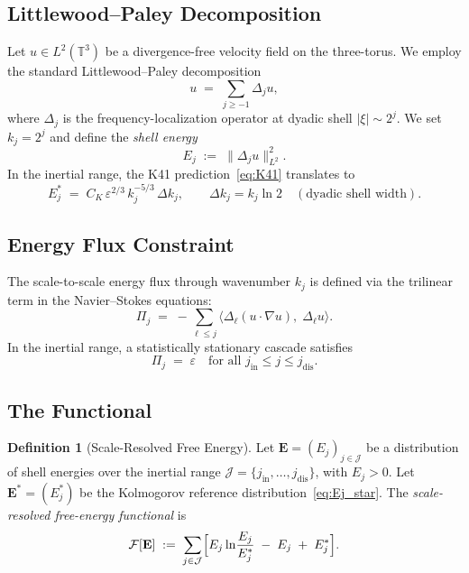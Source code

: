 \documentclass[12pt,a4paper]{article}
\theoremstyle{definition}
\newtheorem{definition}{Definition}[section]
\theoremstyle{plain}
\theoremstyle{remark}
\begin{document}
\subsection{Littlewood--Paley Decomposition}

Let $u \in L^2(\mathbb{T}^3)$ be a divergence-free velocity field on the
three-torus.  We employ the standard Littlewood--Paley decomposition
\begin{equation}\label{eq:LP}
  u \;=\; \sum_{j \ge -1} \Delta_j u,
\end{equation}
where $\Delta_j$ is the frequency-localization operator at dyadic shell
$|\xi| \sim 2^j$.  We set $k_j = 2^j$ and define the \emph{shell energy}
\begin{equation}\label{eq:Ej}
  E_j \;:=\; \|\Delta_j u\|_{L^2}^2.
\end{equation}
In the inertial range, the K41 prediction~\eqref{eq:K41} translates to
\begin{equation}\label{eq:Ej_star}
  E_j^* \;=\; C_K\, \varepsilon^{2/3}\, k_j^{-5/3} \,\Delta k_j,
  \qquad \Delta k_j = k_j \ln 2 \quad (\text{dyadic shell width}).
\end{equation}

\subsection{Energy Flux Constraint}

The scale-to-scale energy flux through wavenumber $k_j$ is defined via the
trilinear term in the Navier--Stokes equations:
\begin{equation}\label{eq:flux}
  \Pi_j \;=\; -\sum_{\ell \le j}
    \langle \Delta_\ell(u \cdot \nabla u),\; \Delta_\ell u \rangle.
\end{equation}
In the inertial range, a statistically stationary cascade satisfies
\begin{equation}\label{eq:const_flux}
  \Pi_j \;=\; \varepsilon \quad \text{for all } j_{\mathrm{in}} \le j \le j_{\mathrm{dis}}.
\end{equation}

\subsection{The Functional}

\begin{definition}[Scale-Resolved Free Energy]\label{def:F}
Let $\mathbf{E} = (E_j)_{j \in \mathcal{J}}$ be a distribution of shell
energies over the inertial range $\mathcal{J} = \{j_{\mathrm{in}}, \dots,
j_{\mathrm{dis}}\}$, with $E_j > 0$.  Let $\mathbf{E}^* = (E_j^*)$ be
the Kolmogorov reference distribution~\eqref{eq:Ej_star}.  The
\emph{scale-resolved free-energy functional} is
\begin{equation}\label{eq:F}
  \mathcal{F}[\mathbf{E}]
  \;:=\;
  \sum_{j \in \mathcal{J}}
  \Bigl[
    E_j \ln\!\frac{E_j}{E_j^*} \;-\; E_j \;+\; E_j^*
  \Bigr].
\end{equation}
\end{definition}
\end{document}
